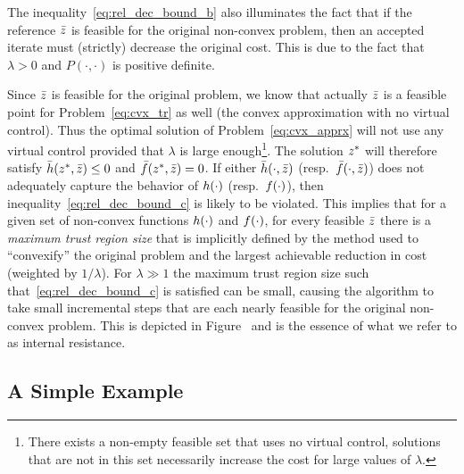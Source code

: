 \documentclass[letterpaper, 10 pt, conference]{ieeeconf}
\begin{document}
\begin{remark}
The inequality~\eqref{eq:rel_dec_bound_b} also illuminates the fact that if the reference $\bar{z}$ is feasible for the original non-convex problem, then an accepted iterate must (strictly) decrease the original cost. This is due to the fact that $\lambda>0$ and $P(\cdot,\cdot)$ is positive definite.
\end{remark}

Since $\bar{z}$ is feasible for the original problem, we know that actually $\bar{z}$ is a feasible point for Problem~\eqref{eq:cvx_tr} as well (the convex approximation with no virtual control). Thus the optimal solution of Problem~\eqref{eq:cvx_apprx} will not use any virtual control provided that $\lambda$ is large enough\footnote{There exists a non-empty feasible set that uses no virtual control, solutions that are not in this set necessarily increase the cost for large values of $\lambda$.}. The solution $z^*$ will therefore satisfy $\bar{h}(z^*,\bar{z})\leq 0$ and $\bar{f}(z^*,\bar{z})=0$. If either $\bar{h}(\cdot,\bar{z})$ (resp.~$\bar{f}(\cdot,\bar{z})$) does not adequately capture the behavior of $h(\cdot)$ (resp.~$f(\cdot)$), then inequality~\eqref{eq:rel_dec_bound_c} is likely to be violated. This implies that for a given set of non-convex functions $h(\cdot)$ and $f(\cdot)$, for every feasible $\bar{z}$ there is a \textit{maximum trust region size} that is implicitly defined by the method used to ``convexify'' the original problem and the largest achievable reduction in cost (weighted by $1/\lambda$). For $\lambda\gg1$ the maximum trust region size such that~\eqref{eq:rel_dec_bound_c} is satisfied can be small, causing the algorithm to take small incremental steps that are each nearly feasible for the original non-convex problem. This is depicted in Figure~ and is the essence of what we refer to as internal resistance.

\subsection{A Simple Example}\label{subsec:toy_example}
\end{document}
